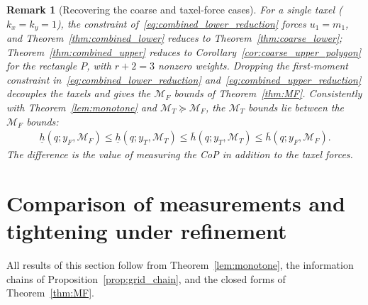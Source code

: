 \documentclass[11pt,a4paper]{article}
\theoremstyle{plain}
\newtheorem{remark}[theorem]{Remark}
\begin{document}
\begin{remark}[Recovering the coarse and taxel-force cases]
\label{rem:MT_special}
    For a single taxel ($k_x=k_y=1$), the constraint of~\eqref{eq:combined_lower_reduction} forces $u_1=m_1$, and Theorem~\ref{thm:combined_lower} reduces to Theorem~\ref{thm:coarse_lower};
    Theorem~\ref{thm:combined_upper} reduces to Corollary~\ref{cor:coarse_upper_polygon} for the rectangle $P$, with $r+2=3$ nonzero weights.
    Dropping the first-moment constraint in~\eqref{eq:combined_lower_reduction} and~\eqref{eq:combined_upper_reduction} decouples the taxels and gives the $\mathcal M_F$ bounds of
    Theorem~\ref{thm:MF}. Consistently with Theorem~\ref{lem:monotone} and $\mathcal M_T\succeq\mathcal M_F$, the $\mathcal M_T$ bounds lie between the $\mathcal M_F$ bounds:
    \begin{align}
        \label{eq:cellwise_MT}
        \underline h(q;y_F,\mathcal M_F)\le\underline h(q;y_T,\mathcal M_T)\le\overline h(q;y_T,\mathcal M_T)\le\overline h(q;y_F,\mathcal M_F).
    \end{align}
    The difference is the value of measuring the CoP in addition to the taxel forces.
\end{remark}

\section{Comparison of measurements and tightening under refinement}
\label{sec:refinement}

All results of this section follow from Theorem~\ref{lem:monotone}, the information chains of Proposition~\ref{prop:grid_chain}, and the closed forms of Theorem~\ref{thm:MF}.
\end{document}
